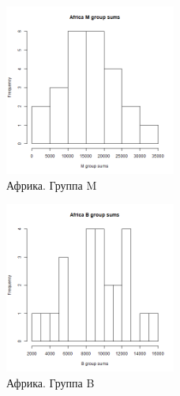\begin{figure}[!htb]
    \centering
    \includegraphics[width=0.5\textwidth]{fig/Africa_M.png}
    \caption{Африка. Группа M}
\end{figure}
\newpage
\begin{figure}[!htb]
    \centering
    \includegraphics[width=0.5\textwidth]{fig/Africa_B.png}
    \caption{Африка. Группа B}
\end{figure}

